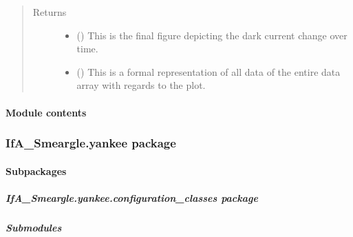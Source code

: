 \documentclass[letterpaper,10pt,english]{sphinxmanual}
\begin{document}
\begin{fulllineitems}
\begin{quote}
\begin{description}
\item[{Returns}] \leavevmode
\begin{itemize}
\item {} 
 () \textendash{} This is the final figure depicting the dark current change over time.

\item {} 
 () \textendash{} This is a formal representation of all data of the entire data array
with regards to the plot.

\end{itemize}


\end{description}\end{quote}

\end{fulllineitems}



\paragraph{Module contents}
\label{\detokenize{python_docstrings/IfA_Smeargle.oscar:module-IfA_Smeargle.oscar}}\label{\detokenize{python_docstrings/IfA_Smeargle.oscar:module-contents}}

\subsubsection{IfA\_Smeargle.yankee package}
\label{\detokenize{python_docstrings/IfA_Smeargle.yankee:ifa-smeargle-yankee-package}}\label{\detokenize{python_docstrings/IfA_Smeargle.yankee::doc}}

\paragraph{Subpackages}
\label{\detokenize{python_docstrings/IfA_Smeargle.yankee:subpackages}}

\subparagraph{IfA\_Smeargle.yankee.configuration\_classes package}
\label{\detokenize{python_docstrings/IfA_Smeargle.yankee.configuration_classes:ifa-smeargle-yankee-configuration-classes-package}}\label{\detokenize{python_docstrings/IfA_Smeargle.yankee.configuration_classes::doc}}

\subparagraph{Submodules}
\label{\detokenize{python_docstrings/IfA_Smeargle.yankee.configuration_classes:submodules}}
\end{document}
